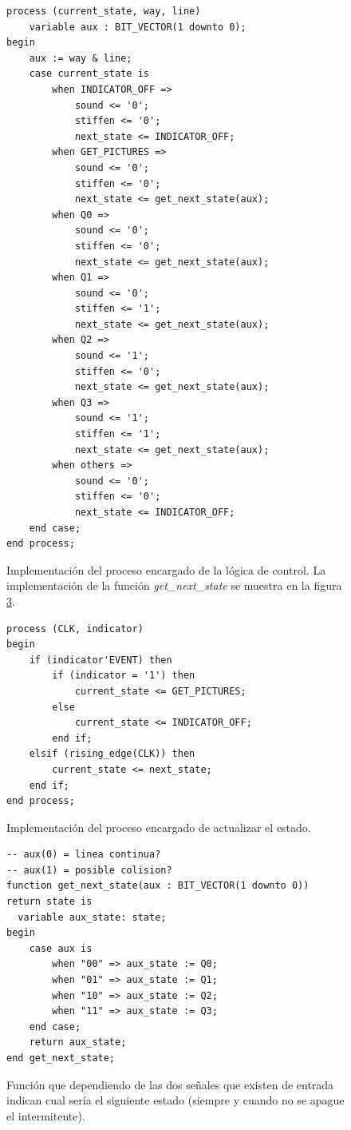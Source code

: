 \documentclass{article}
\begin{document}
\begin{figure}[h]
	\begin{lstlisting}[style=vhdl]
process (current_state, way, line)
	variable aux : BIT_VECTOR(1 downto 0);
begin
	aux := way & line;
	case current_state is
		when INDICATOR_OFF =>
			sound <= '0';
			stiffen <= '0';
			next_state <= INDICATOR_OFF;
		when GET_PICTURES =>
			sound <= '0';
			stiffen <= '0';
			next_state <= get_next_state(aux);
		when Q0 =>
			sound <= '0';
			stiffen <= '0';
			next_state <= get_next_state(aux);
		when Q1 =>
			sound <= '0';
			stiffen <= '1';
			next_state <= get_next_state(aux);
		when Q2 =>
			sound <= '1';
			stiffen <= '0';
			next_state <= get_next_state(aux);
		when Q3 =>
			sound <= '1';
			stiffen <= '1';
			next_state <= get_next_state(aux);
		when others =>
			sound <= '0';
			stiffen <= '0';
			next_state <= INDICATOR_OFF;
	end case;
end process;
	\end{lstlisting}
	\caption{Implementación del proceso encargado de la lógica de control. La implementación de la función \emph{get\_next\_state} se muestra en la figura \ref{cod:p6:get_next_state}.}
	\label{cod:p6:control_process}
\end{figure}
	
\begin{figure}[h]
	\begin{lstlisting}[style=vhdl]	
process (CLK, indicator)
begin
	if (indicator'EVENT) then
		if (indicator = '1') then
			current_state <= GET_PICTURES;
		else
			current_state <= INDICATOR_OFF;
		end if;
	elsif (rising_edge(CLK)) then
		current_state <= next_state;
	end if;
end process;
	\end{lstlisting}
	\caption{Implementación del proceso encargado de actualizar el estado.}
	\label{cod:p6:control_update}
\end{figure}	

\begin{figure}[h]
	\begin{lstlisting}[style=vhdl]	
-- aux(0) = linea continua?
-- aux(1) = posible colision?
function get_next_state(aux : BIT_VECTOR(1 downto 0)) return state is
  variable aux_state: state;
begin
	case aux is
		when "00" => aux_state := Q0;
		when "01" => aux_state := Q1;
		when "10" => aux_state := Q2;
		when "11" => aux_state := Q3;
	end case;
	return aux_state;
end get_next_state;
	\end{lstlisting}
	\caption{Función que dependiendo de las dos señales que existen de entrada indican cual sería el siguiente estado (siempre y cuando no se apague el intermitente).}
	\label{cod:p6:get_next_state}
\end{figure}	
\end{document}
